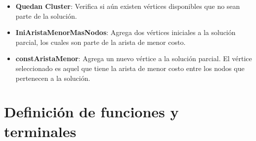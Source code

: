 \begin{itemize}

\item \textbf{Quedan Cluster}: Verifica si aún existen vértices disponibles que no sean parte de la solución.

\item \textbf{IniAristaMenorMasNodos}: Agrega dos vértices iniciales a la solución parcial, los cuales son parte de la arista de menor costo.

\item \textbf{constAristaMenor}: Agrega un nuevo vértice a la solución parcial. El vértice seleccionado es aquel que tiene la arista de menor costo entre los nodos que pertenecen a la solución.
\end{itemize}



%






\section{Definición de funciones y terminales}\label{cap:definicion_terminales}

